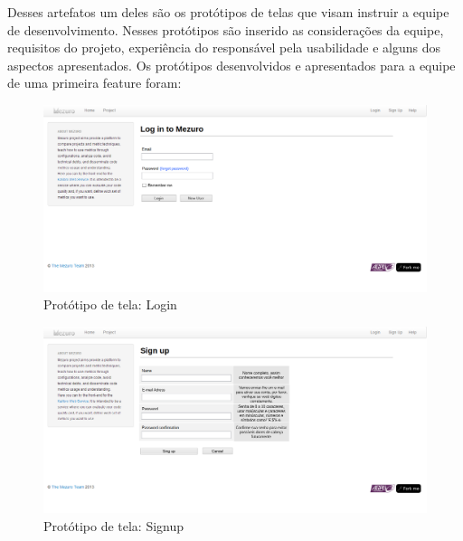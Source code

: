 Desses artefatos um deles são os protótipos de telas que visam instruir a equipe de desenvolvimento. Nesses protótipos são inserido as considerações da equipe, requisitos do projeto, experiência do responsável pela usabilidade e alguns dos aspectos apresentados. Os protótipos desenvolvidos e apresentados para a equipe de uma primeira feature foram:
 
\begin{figure}[H]
  \begin{center}
    \includegraphics[width=1\textwidth]{figuras/Login.png}
    \caption{Protótipo de tela: Login}
    \label{fig:pLogin}
  \end{center}
\end{figure}

\begin{figure}[H]
  \begin{center}
    \includegraphics[width=1\textwidth]{figuras/Signup.png}
    \caption{Protótipo de tela: Signup}
    \label{fig:pSignup}
  \end{center}
\end{figure}

